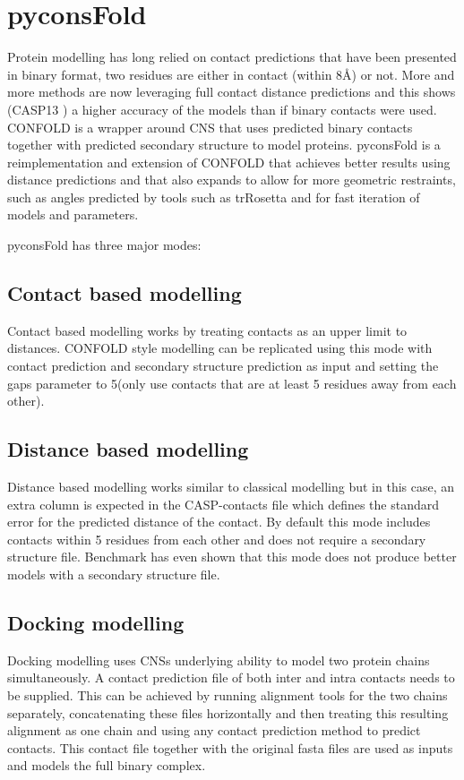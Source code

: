 \documentclass{bioinfo}
\begin{document}
\maketitle

\section{pyconsFold}
Protein modelling has long relied on contact predictions that have been presented in binary format, two residues are either in contact (within 8Å) or not. More and more methods are now leveraging full contact distance predictions and this shows (CASP13 \cite{Kryshtafovych2019-zb,Yang1496}) a higher accuracy of the models than if binary contacts were used. 
CONFOLD is a wrapper around CNS that uses predicted binary contacts together with predicted secondary structure to model proteins. pyconsFold is a reimplementation and extension of CONFOLD that achieves better results using distance predictions and that also expands to allow for more geometric restraints, such as angles predicted by tools such as trRosetta and for fast iteration of models and parameters.

pyconsFold has three major modes:

\subsection{Contact based modelling}
Contact based modelling works by treating contacts as an upper limit to distances. CONFOLD style modelling can be replicated using this mode with contact prediction and secondary structure prediction as input and setting the gaps parameter to 5(only use contacts that are at least 5 residues away from each other).

\subsection{Distance based modelling}
Distance based modelling works similar to classical modelling but in this case, an extra column is expected in the CASP-contacts file which defines the standard error for the predicted distance of the contact. By default this mode includes contacts within 5 residues from each other and does not require a secondary structure file. Benchmark has even shown that this mode does not produce better models with a secondary structure file.

\subsection{Docking modelling}
Docking modelling uses CNSs underlying ability to model two protein chains simultaneously. A contact prediction file of both inter and intra contacts needs to be supplied. This can be achieved by running alignment tools for the two chains separately, concatenating these files horizontally and then treating this resulting alignment as one chain and using any contact prediction method to predict contacts. This contact file together with the original fasta files are used as inputs and models the full binary complex.
\end{document}
